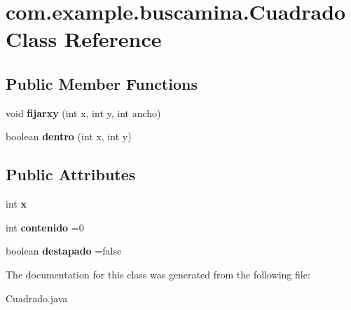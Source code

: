 \section{com.\-example.\-buscamina.\-Cuadrado Class Reference}
\label{classcom_1_1example_1_1buscamina_1_1_cuadrado}
\subsection*{Public Member Functions}
\begin{DoxyCompactItemize}
\item 
void {\bfseries fijarxy} (int x, int y, int ancho)\label{classcom_1_1example_1_1buscamina_1_1_cuadrado_a92c6b096b06a81a9021352b812c54139}

\item 
boolean {\bfseries dentro} (int x, int y)\label{classcom_1_1example_1_1buscamina_1_1_cuadrado_a9177d47efb1b0c9d26edfe76397374d3}

\end{DoxyCompactItemize}
\subsection*{Public Attributes}
\begin{DoxyCompactItemize}
\item 
int {\bfseries x}\label{classcom_1_1example_1_1buscamina_1_1_cuadrado_ad75af7438609cc83ff9d782213b4a99f}

\item 
int {\bfseries contenido} =0\label{classcom_1_1example_1_1buscamina_1_1_cuadrado_abb0aed3e331e05e9f8751cab6e12ba68}

\item 
boolean {\bfseries destapado} =false\label{classcom_1_1example_1_1buscamina_1_1_cuadrado_a7db0f2387e400dc513e448ac6245d992}

\end{DoxyCompactItemize}


The documentation for this class was generated from the following file\-:\begin{DoxyCompactItemize}
\item 
Cuadrado.\-java\end{DoxyCompactItemize}
